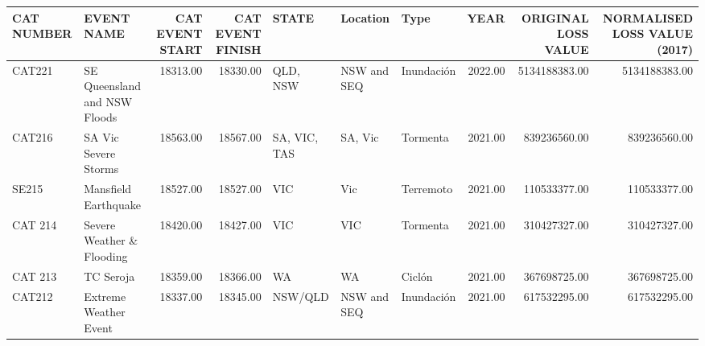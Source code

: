 \begin{table}[ht]
\centering
\begin{tabular}{llrrlllrrr}
  \hline
CAT NUMBER & EVENT NAME & CAT EVENT START & CAT EVENT FINISH & STATE & Location & Type & YEAR & ORIGINAL LOSS VALUE & NORMALISED LOSS VALUE (2017) \\ 
  \hline
CAT221 & SE Queensland and NSW Floods & 18313.00 & 18330.00 & QLD, NSW & NSW and SEQ & Inundación & 2022.00 & 5134188383.00 & 5134188383.00 \\ 
  CAT216 & SA Vic Severe Storms & 18563.00 & 18567.00 & SA, VIC, TAS & SA, Vic & Tormenta & 2021.00 & 839236560.00 & 839236560.00 \\ 
  SE215 & Mansfield Earthquake & 18527.00 & 18527.00 & VIC & Vic & Terremoto & 2021.00 & 110533377.00 & 110533377.00 \\ 
  CAT 214 & Severe Weather \& Flooding & 18420.00 & 18427.00 & VIC & VIC & Tormenta & 2021.00 & 310427327.00 & 310427327.00 \\ 
  CAT 213 & TC Seroja & 18359.00 & 18366.00 & WA & WA & Ciclón & 2021.00 & 367698725.00 & 367698725.00 \\ 
  CAT212 & Extreme Weather Event & 18337.00 & 18345.00 & NSW/QLD & NSW and SEQ & Inundación & 2021.00 & 617532295.00 & 617532295.00 \\ 
   \hline
\end{tabular}
\end{table}
